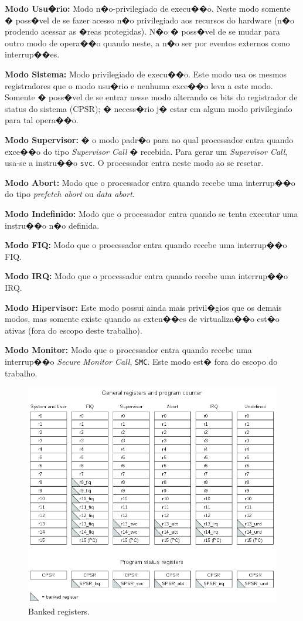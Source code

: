 \documentclass{ufscThesis/ufscThesis} %
\begin{document}
\textbf{Modo Usu�rio:} Modo n�o-privilegiado de execu��o. Neste modo somente � poss�vel de se fazer acesso n�o privilegiado aos recursos do hardware (n�o prodendo acessar as �reas protegidas). N�o � poss�vel de se mudar para outro modo de opera��o quando neste, a n�o ser por eventos externos como interrup��es.

\textbf{Modo Sistema:} Modo privilegiado de execu��o. Este modo usa os mesmos registradores que o modo usu�rio e nenhuma exce��o leva a este modo. Somente � poss�vel de se entrar nesse modo alterando os bits do registrador de status do sistema (CPSR); � necess�rio j� estar em algum modo privilegiado para tal opera��o.

\textbf{Modo Supervisor:} � o modo padr�o para no qual processador entra quando exce��o do tipo \emph{Supervisor Call} � recebida.
Para gerar um \emph{Supervisor Call}, usa-se a instru��o \verb+svc+. O processador entra neste modo ao se resetar.

\textbf{Modo Abort:} Modo que o processador entra quando recebe uma interrup��o do tipo \emph{prefetch abort} ou \emph{data abort}.

\textbf{Modo Indefinido:} Modo que o processador entra quando se tenta executar uma instru��o n�o definida.

\textbf{Modo FIQ:} Modo que o processador entra quando recebe uma interrup��o FIQ.

\textbf{Modo IRQ:} Modo que o processador entra quando recebe uma interrup��o IRQ.

\textbf{Modo Hipervisor:} Este modo possui ainda mais privil�gios que os demais modos, mas somente existe quando as exten��es de virtualiza��o est�o ativas (fora do escopo deste trabalho).

\textbf{Modo Monitor:} Modo que o processador entra quando recebe uma interrup��o \emph{Secure Monitor Call}, \verb+SMC+. Este modo est� fora do escopo do trabalho.


\begin{figure}[ht!]
	\centerline{
    \includegraphics[width=12cm]{figuras/banked_registers}
	}
    \caption{Banked registers.}
\end{figure}
\end{document}

